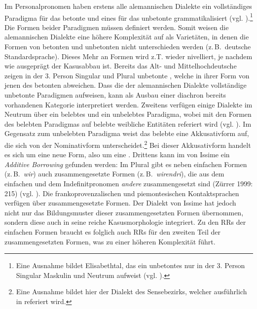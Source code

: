 Im {Personalpronomen} haben erstens alle alemannischen Dialekte ein vollständiges Paradigma für das betonte  und eines für das unbetonte grammatikalisiert (vgl. ).\footnote{Eine Ausnahme bildet Elisabethtal, das ein unbetontes  nur in der 3. Person Singular Maskulin und Neutrum aufweist (vgl. ).} Die Formen beider Paradigmen müssen definiert werden. Somit weisen die alemannischen Dialekte eine höhere Komplexität auf als Varietäten, in denen die Formen von betonten und unbetonten  nicht unterschieden werden (z.\,B.\ deutsche Standardsprache). Dieses Mehr an Formen wird z.T. wieder nivelliert, je nachdem wie ausgeprägt der Kasusabbau ist. Bereits das Alt- und Mittelhochdeutsche zeigen in der 3. Person Singular und Plural unbetonte , welche in ihrer Form von jenen des betonten  abweichen. Dass die  der alemannischen Dialekte vollständige unbetonte Paradigmen aufweisen, kann als Ausbau einer diachron bereits vorhandenen Kategorie interpretiert werden. Zweitens verfügen einige Dialekte im Neutrum über ein belebtes und ein unbelebtes Paradigma, wobei mit den Formen des belebten Paradigmas auf belebte weibliche Entitäten referiert wird (vgl. ). Im Gegensatz zum unbelebten Paradigma weist das belebte eine Akkusativform auf, die sich von der Nominativform unterscheidet.\footnote{Eine Ausnahme bildet hier der Dialekt des Sensebezirks, welcher ausführlich in  referiert wird.} Bei dieser Akkusativform handelt es sich um eine neue Form, also um eine . Drittens kann im  von Issime ein \textit{Additive Borrowing} gefunden werden: Im Plural gibt es neben einfachen Formen (z.\,B.\ \textit{wir}) auch zusammengesetzte Formen (z.\,B.\ \textit{wirendri}), die aus dem einfachen  und dem Indefinitpronomen \textit{andere} zusammengesetzt sind (Zürrer 1999: 215) (vgl. ). Die frankoprovenzalischen und piemontesischen Kontaktsprachen verfügen über zusammengesetzte Formen. Der Dialekt von Issime hat jedoch nicht nur das Bildungsmuster dieser zusammengesetzten Formen übernommen, sondern diese auch in seine reiche Kasusmorphologie integriert. Zu den RRs der einfachen Formen braucht es folglich auch RRs für den zweiten Teil der zusammengesetzten Formen, was zu einer höheren Komplexität führt.

